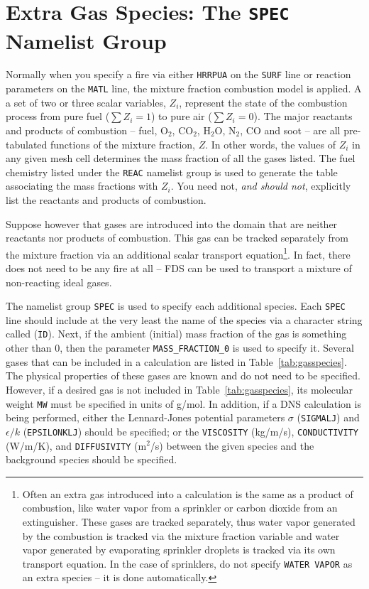 \documentclass[11pt]{book}
\newcommand{\ct}{\tt\small}
\begin{document}
\section{Extra Gas Species: The \texorpdfstring{{\tt SPEC}}{SPEC} Namelist Group}
\label{info:SPEC}

Normally when you specify a fire via either {\ct HRRPUA} on the {\ct SURF} line or
reaction parameters on the {\ct MATL} line, the mixture fraction combustion model
is applied. A a set of two or three scalar variables, $Z_i$, represent the state of
the combustion process from pure fuel ($\sum Z_i=1$) to pure air ($\sum Z_i=0$).
The major reactants and products of combustion -- fuel, O$_2$, CO$_2$,
H$_2$O, N$_2$, CO and soot -- are all pre-tabulated functions of
the mixture fraction, $Z$. In other words, the values of $Z_i$ in any
given mesh cell determines the mass fraction of all the gases listed.
The fuel chemistry listed under the {\ct REAC} namelist
group is used to generate the table associating the mass fractions
with $Z_i$. You need not, {\em and should not},
explicitly list the reactants and products of combustion.

Suppose however that gases are introduced into the
domain that are neither reactants nor products of combustion.
This gas can be tracked separately from the mixture fraction via an additional scalar transport equation\footnote{
Often an extra gas introduced into a calculation is the same as a
product of combustion, like water vapor from a sprinkler or carbon
dioxide from an extinguisher. These gases are tracked separately,
thus water vapor generated by the combustion is tracked via the
mixture fraction variable and water vapor generated by evaporating
sprinkler droplets is tracked via its own transport equation. In the
case of sprinklers, do not specify {\ct WATER VAPOR} as
an extra species -- it is done automatically.}.
In fact, there does not need to be any fire
at all -- FDS can be used to transport a mixture of non-reacting
ideal gases.

The namelist group {\ct SPEC} is used to specify each additional
species. Each {\ct SPEC} line should include at the very least
the name of the species via a character string called ({\ct ID}).
Next, if the ambient (initial) mass fraction of the gas is something
other than 0, then the parameter {\ct MASS\_FRACTION\_0} is used to
specify it.
Several gases that can be included in a calculation are listed in
Table~\ref{tab:gasspecies}. The physical properties
of these gases are known and do not need to be specified. However, if a
desired gas is not included in Table~\ref{tab:gasspecies}, its
molecular weight {\ct MW} must be specified in units of g/mol.
In addition, if a DNS calculation is being performed, either
the Lennard-Jones potential parameters $\sigma$ ({\ct SIGMALJ}) and
$\epsilon/k$ ({\ct EPSILONKLJ}) should be specified; or
the {\ct VISCOSITY} (kg/m/s), {\ct CONDUCTIVITY} (W/m/K), and
{\ct DIFFUSIVITY} (m$^2$/s) between the given species
and the background species should be specified.
\end{document}
